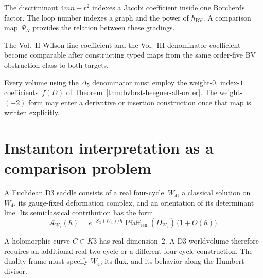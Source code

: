 \begin{remark}
\label{rem:bvbrst-4loop-mod4-graph-level}
The discriminant $4mn-r^2$ indexes a Jacobi coefficient inside one
Borcherds factor.  The loop number indexes a graph and the power of
$\hbar_{\mathrm{BV}}$.  A comparison map~$\Psi_N$ provides the
relation between these gradings.
\end{remark}

\begin{remark}
\label{rem:bvbrst-5loop-cross-volume}
The Vol.~II Wilson-line coefficient and the Vol.~III denominator
coefficient become comparable after constructing typed maps from the
same order-five BV obstruction class to both targets.
\end{remark}

\begin{remark}
\label{rem:bvbrst-heegner-cross-volume}
Every volume using the $\Delta _5$ denominator must employ the
weight-$0$, index-$1$ coefficients~$f(D)$ of
Theorem~\ref{thm:bvbrst-heegner-all-order}.  The weight-$(-2)$ form
may enter a derivative or insertion construction once that map is
written explicitly.
\end{remark}

\section{Instanton interpretation as a comparison problem}
\label{sec:bvbrst-nonperturbative-d3}

\begin{definition}
\label{def:bvbrst-d3-instanton-amplitude}
A Euclidean D3 saddle consists of a real four-cycle~$W_4$, a classical
solution on~$W_4$, its gauge-fixed deformation complex, and an
orientation of its determinant line.  Its semiclassical contribution
has the form
\begin{equation}\label{eq:bvbrst-d3-amp}
 \mathcal A_{W_4}(\hbar)=
 e^{-S_{\mathrm{cl}}(W_4)/\hbar}
 \operatorname{Pfaff}_{\mathrm{ren}}(D_{W_4})\,
 \bigl(1+O(\hbar)\bigr).
\end{equation}
\end{definition}

\begin{remark}
\label{rem:bvbrst-d3-worldvolume-humbert}
A holomorphic curve $C\subset K3$ has real dimension~$2$.  A D3
worldvolume therefore requires an additional real two-cycle or a
different four-cycle construction.  The duality frame must specify
$W_4$, its flux, and its behavior along the Humbert divisor.
\end{remark}

